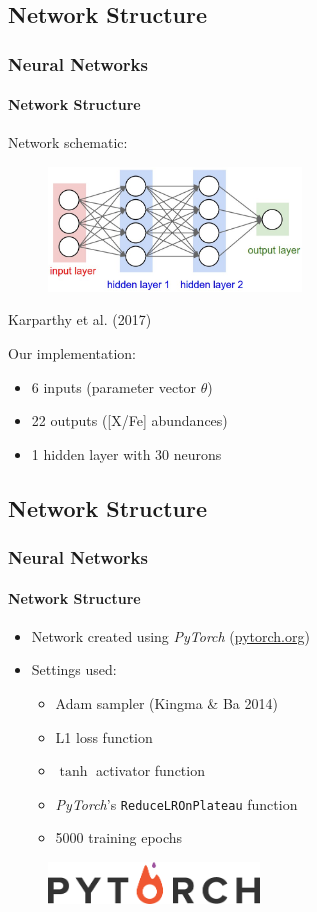 \documentclass{beamer}
\begin{document}
\subsection{Network Structure}
\begin{frame}
\frametitle{Neural Networks}
\framesubtitle{Network Structure}
Network schematic: 
\begin{figure}
\includegraphics[width=0.6\textwidth]{neural_net2.png}
\end{figure}
\begin{tiny}
Karparthy et al. (2017)\\
\end{tiny}
Our implementation:
\begin{itemize}
\item 6 inputs (parameter vector $\theta$)
\item 22 outputs ([X/Fe] abundances)
\item 1 hidden layer with 30 neurons
\end{itemize}
\end{frame}

\subsection{Network Structure}
\begin{frame}
\frametitle{Neural Networks}
\framesubtitle{Network Structure}
\begin{itemize}
\item Network created using \textit{PyTorch} (\url{pytorch.org})
\item Settings used:
\begin{itemize}
\item Adam sampler (Kingma \& Ba 2014)
\item L1 loss function
\item $\tanh$ activator function
\item \textit{PyTorch}'s  \texttt{ReduceLROnPlateau} function
\item 5000 training epochs
\end{itemize}
\end{itemize}
\begin{figure}
\centering
\includegraphics[width = 0.5\textwidth]{index.png}
\end{figure}
\end{frame}
\end{document}
